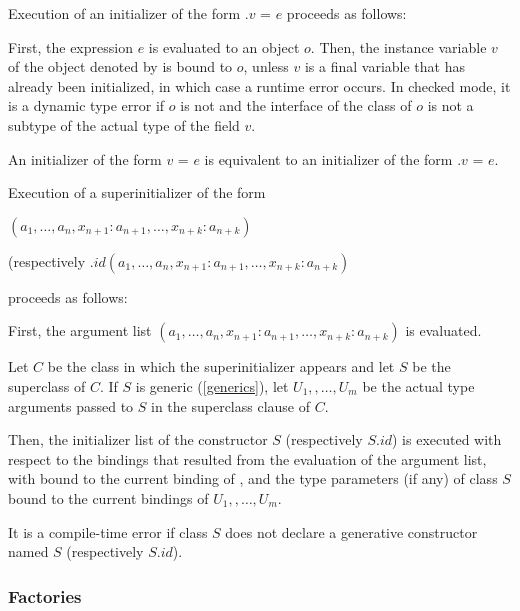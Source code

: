 \documentclass{article}
\newcommand{\code}[1]{{\sf #1}}
\begin{document}

\LMHash{}
Execution of an initializer of the form \code{\THIS{}.$v$ = $e$} proceeds as follows:

\LMHash{}
First, the expression $e$ is evaluated to an object $o$. Then, the instance variable $v$ of the object denoted by \THIS{} is bound to $o$, unless $v$ is a final variable that has already been initialized, in which case a runtime error occurs. In checked mode, it is a dynamic type error if $o$ is not \NULL{} and the interface of the class of $o$ is not a subtype of the actual type of the field $v$.

\LMHash{}
An initializer of the form \code{$v$ = $e$} is equivalent to an initializer of the form  \code{\THIS{}.$v$ = $e$}.

\LMHash{}
Execution of a superinitializer of the form

\SUPER{}$(a_1, \ldots, a_n,  x_{n+1}: a_{n+1}, \ldots, x_{n+k}: a_{n+k})$

(respectively  \SUPER{}$.id(a_1, \ldots, a_n, x_{n+1}: a_{n+1}, \ldots, x_{n+k}: a_{n+k})$

proceeds as follows:

\LMHash{}
First, the argument list $(a_1, \ldots, a_n, x_{n+1}: a_{n+1}, \ldots, x_{n+k}: a_{n+k})$ is evaluated.

\LMHash{}
Let $C$ be the class in which the superinitializer appears and let $S$ be the superclass of $C$.  If $S$ is generic (\ref{generics}), let $U_1, , \ldots, U_m$ be the actual type arguments passed to $S$ in the superclass clause of $C$.

\LMHash{}
Then, the initializer list of the constructor $S$ (respectively $S.id$) is executed with respect to the bindings that resulted from the evaluation of the argument list,  with \THIS{} bound to the current binding of \THIS{}, and  the type parameters (if any) of class $S$ bound to the current bindings of $U_1, , \ldots, U_m$.

\LMHash{}
It is a compile-time error if class $S$ does not declare a generative constructor named $S$ (respectively $S.id$).

\subsubsection{Factories}
\end{document}
